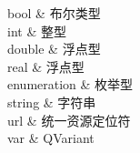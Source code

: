﻿



 
bool
    &
布尔类型
    \\
 
int
    &
整型
    \\

double
    &
浮点型
    \\

real
    &
浮点型
    \\

enumeration
    &
枚举型
    \\

string
    &
字符串
    \\

url
    &
统一资源定位符
    \\

var
    &
QVariant
    \\




%
%
%
%
%


















